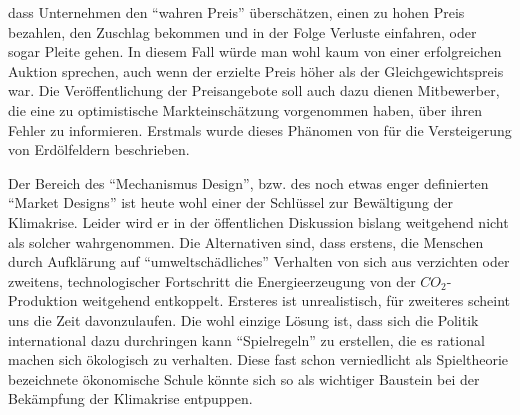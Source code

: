 dass Unternehmen den "`wahren Preis"' überschätzen, einen zu hohen Preis bezahlen, den Zuschlag bekommen und in der Folge Verluste einfahren, oder sogar Pleite gehen. In diesem Fall würde man wohl kaum von einer erfolgreichen Auktion sprechen, auch wenn der erzielte Preis höher als der Gleichgewichtspreis war. Die Veröffentlichung der Preisangebote soll auch dazu dienen Mitbewerber, die eine zu optimistische Markteinschätzung vorgenommen haben, über ihren Fehler zu informieren. Erstmals wurde dieses Phänomen von \textcite{Capen1971} für die Versteigerung von Erdölfeldern beschrieben.

Der Bereich des "`Mechanismus Design"', bzw. des noch etwas enger definierten "`Market Designs"' ist heute wohl einer der Schlüssel zur Bewältigung der Klimakrise. Leider wird er in der öffentlichen Diskussion bislang weitgehend nicht als solcher wahrgenommen. Die Alternativen sind, dass erstens, die Menschen durch Aufklärung auf "`umweltschädliches"' Verhalten von sich aus verzichten oder zweitens, technologischer Fortschritt die Energieerzeugung von der $CO_2$-Produktion weitgehend entkoppelt. Ersteres ist unrealistisch, für zweiteres scheint uns die Zeit davonzulaufen. Die wohl einzige Lösung ist, dass sich die Politik international dazu durchringen kann "`Spielregeln"' zu erstellen, die es rational machen sich ökologisch zu verhalten. Diese fast schon verniedlicht als Spieltheorie bezeichnete ökonomische Schule könnte sich so als wichtiger Baustein bei der Bekämpfung der Klimakrise entpuppen.